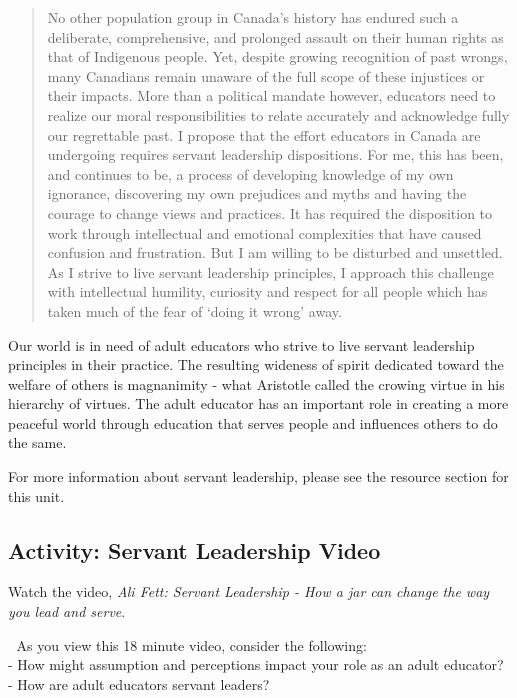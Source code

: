 \documentclass[
]{book}
\begin{document}
\begin{quote}
No other population group in Canada's history has endured such a deliberate,
comprehensive, and prolonged assault on their human rights as that of Indigenous
people. Yet, despite growing recognition of past wrongs, many Canadians remain
unaware of the full scope of these injustices or their impacts.
More than a political mandate however, educators need to realize our moral
responsibilities to relate accurately and acknowledge fully our regrettable
past. I propose that the effort educators in Canada are undergoing requires
servant leadership dispositions. For me, this has been, and continues to be, a
process of developing knowledge of my own ignorance, discovering my own
prejudices and myths and having the courage to change views and practices. It
has required the disposition to work through intellectual and emotional
complexities that have caused confusion and frustration. But I am willing to be
disturbed and unsettled. As I strive to live servant leadership principles, I
approach this challenge with intellectual humility, curiosity and respect for
all people which has taken much of the fear of `doing it wrong' away.
\end{quote}

Our world is in need of adult educators who strive to live servant leadership
principles in their practice. The resulting wideness of spirit dedicated toward
the welfare of others is magnanimity - what Aristotle called the crowing virtue
in his hierarchy of virtues. The adult educator has an important role in
creating a more peaceful world through education that serves people and
influences others to do the same.

For more information about servant leadership, please see the resource section
for this unit.

\hypertarget{activity-servant-leadership-video}{%
\subsection{Activity: Servant Leadership Video}\label{activity-servant-leadership-video}}

\begin{reflect}
Watch the video, \emph{Ali Fett: Servant Leadership - How a jar can
change the way you lead and serve}.

💭 As you view this 18 minute video, consider the following:\\
- How might assumption and perceptions impact your role as an adult
educator?\\
- How are adult educators servant leaders?
\end{reflect}
\end{document}

